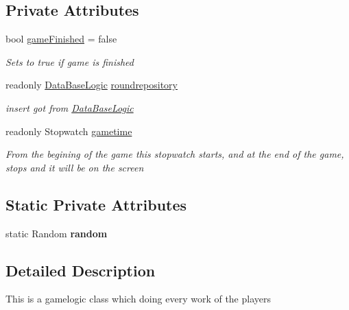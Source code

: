 \subsection*{Private Attributes}
\begin{DoxyCompactItemize}
\item 
bool \mbox{\hyperlink{class_bomberman_1_1_business_logic_1_1_game_logic_a0cd143c2c9e45fcbc7cea22b7d5f900b}{game\+Finished}} = false
\begin{DoxyCompactList}\small\item\em Sets to true if game is finished \end{DoxyCompactList}\item 
readonly \mbox{\hyperlink{class_bomberman_1_1_business_logic_1_1_data_base_logic}{Data\+Base\+Logic}} \mbox{\hyperlink{class_bomberman_1_1_business_logic_1_1_game_logic_a95da6fac5895dd6800d792cbb90e48eb}{roundrepository}}
\begin{DoxyCompactList}\small\item\em insert got from \mbox{\hyperlink{class_bomberman_1_1_business_logic_1_1_data_base_logic}{Data\+Base\+Logic}} \end{DoxyCompactList}\item 
readonly Stopwatch \mbox{\hyperlink{class_bomberman_1_1_business_logic_1_1_game_logic_a62af8cf407009e7f8e4b444b152a81c9}{gametime}}
\begin{DoxyCompactList}\small\item\em From the begining of the game this stopwatch starts, and at the end of the game, stops and it will be on the screen \end{DoxyCompactList}\end{DoxyCompactItemize}
\subsection*{Static Private Attributes}
\begin{DoxyCompactItemize}
\item 
\mbox{\label{class_bomberman_1_1_business_logic_1_1_game_logic_aeb3144bb9f435f7bfc7b5ee3a583b0b4}} 
static Random {\bfseries random}
\end{DoxyCompactItemize}


\subsection{Detailed Description}
This is a gamelogic class which doing every work of the players 



